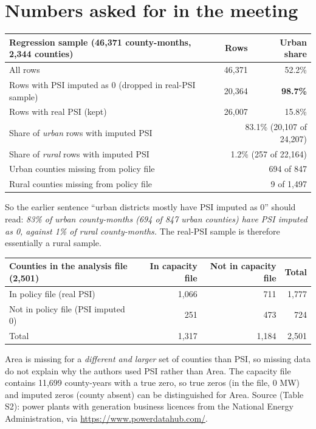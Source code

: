 \documentclass[11pt]{article}
\begin{document}
\section{Numbers asked for in the meeting}
\begin{center}\small
\begin{tabular}{lrr}
\toprule
Regression sample (46,371 county-months, 2,344 counties) & Rows & Urban share \\
\midrule
All rows & 46,371 & 52.2\% \\
Rows with PSI imputed as 0 (dropped in real-PSI sample) & 20,364 & \textbf{98.7\%} \\
Rows with real PSI (kept) & 26,007 & 15.8\% \\
\midrule
Share of \emph{urban} rows with imputed PSI & \multicolumn{2}{r}{83.1\% (20,107 of 24,207)} \\
Share of \emph{rural} rows with imputed PSI & \multicolumn{2}{r}{1.2\% (257 of 22,164)} \\
Urban counties missing from policy file & \multicolumn{2}{r}{694 of 847} \\
Rural counties missing from policy file & \multicolumn{2}{r}{9 of 1,497} \\
\bottomrule
\end{tabular}
\end{center}
So the earlier sentence ``urban districts mostly have PSI imputed as 0'' should read: \emph{83\% of urban county-months (694 of 847 urban counties) have PSI imputed as 0, against 1\% of rural county-months.} The real-PSI sample is therefore essentially a rural sample.

\begin{center}\small
\begin{tabular}{lrrr}
\toprule
Counties in the analysis file (2,501) & In capacity file & Not in capacity file & Total \\
\midrule
In policy file (real PSI) & 1,066 & 711 & 1,777 \\
Not in policy file (PSI imputed 0) & 251 & 473 & 724 \\
\midrule
Total & 1,317 & 1,184 & 2,501 \\
\bottomrule
\end{tabular}
\end{center}
Area is missing for a \emph{different and larger} set of counties than PSI, so missing data do not explain why the authors used PSI rather than Area. The capacity file contains 11,699 county-years with a true zero, so true zeros (in the file, 0 MW) and imputed zeros (county absent) can be distinguished for Area. Source (Table S2): power plants with generation business licences from the National Energy Administration, via \url{https://www.powerdatahub.com/}.
\end{document}
